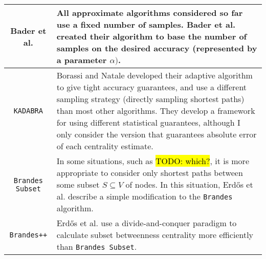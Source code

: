 \documentclass[12pt,a4paper,twoside,openright]{report}
\newcommand{\todo}[1]{\hl{TODO: #1}}
\newcommand{\ttt}[1]{\texttt{#1}}
\newcommand{\erdos}{Erd\H{o}s }
\begin{document}
\begin{table}[H]
\begin{tabularx}{\textwidth}{|c|X|}
			Bader et al. \cite{bader} &
			
			All approximate algorithms considered so far use a fixed number of samples. Bader et al. created their algorithm to base the number of samples on the desired accuracy (represented by a parameter $\alpha)$. \\ 
			\hline
			
			\ttt{KADABRA}\cite{borassi} &
			
			Borassi and Natale developed their adaptive algorithm to give tight accuracy guarantees, and use a different sampling strategy (directly sampling shortest paths) than most other algorithms. They develop a framework for using different statistical guarantees, although I only consider the version that guarantees absolute error of each centrality estimate. \\ 
			\hline
			
			\ttt{Brandes Subset} \cite{erdos} &
			
			In some situations, such as \todo{which?}, it is more appropriate to consider only shortest paths between some subset $S\subseteq V$ of nodes. In this situation, \erdos et al. describe a simple modification to the \ttt{Brandes} algorithm. \\ 
			\hline
			
			\ttt{Brandes++} \cite{erdos} &
			
			\erdos et al. use a divide-and-conquer paradigm to calculate subset betweenness centrality more efficiently than \ttt{Brandes Subset}.  \\ 
			\hline
		\end{tabularx}
	\end{table}
	
\end{document}
